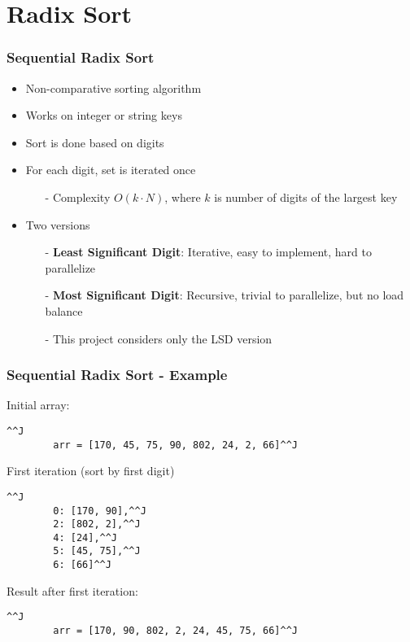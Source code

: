 \section{Radix Sort}

\begin{frame}
	\frametitle{Sequential Radix Sort}

	\begin{itemize}\itemsep=10pt
		\item Non-comparative sorting algorithm
		\item Works on integer or string keys
		\item Sort is done based on digits
		\item For each digit, set is iterated once
		\begin{itemize}
			\item[-] Complexity $O(k \cdot N)$, where $k$ is number of digits of the largest key
		\end{itemize}

		\item Two versions
			\begin{itemize}
				\item[-] \textbf{Least Significant Digit}: Iterative, easy to implement, hard to parallelize
				\item[-] \textbf{Most Significant Digit}: Recursive, trivial to parallelize, but no load balance
				\item[-] This project considers only the LSD version
			\end{itemize}
	\end{itemize}
\end{frame}

\begin{frame}
   \frametitle{Sequential Radix Sort - Example}

	Initial array:
	\begin{lstlisting}^^J
		arr = [170, 45, 75, 90, 802, 24, 2, 66]^^J
	\end{lstlisting}

	First iteration (sort by first digit)
	\begin{lstlisting}^^J
		0: [170, 90],^^J
		2: [802, 2],^^J
		4: [24],^^J
		5: [45, 75],^^J
		6: [66]^^J
	\end{lstlisting}

	Result after first iteration:
	\begin{lstlisting}^^J
		arr = [170, 90, 802, 2, 24, 45, 75, 66]^^J
	\end{lstlisting}
	
\end{frame}


